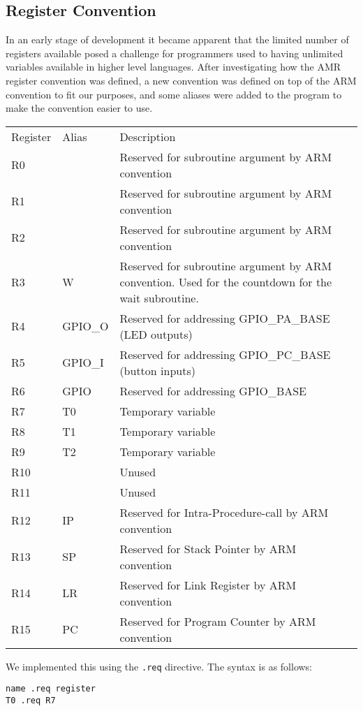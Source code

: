 \subsection{Register Convention}

In an early stage of development it became apparent that the limited number of registers available posed a challenge for programmers used to having unlimited variables available in higher level languages.
After investigating how the AMR register convention was defined, a new convention was defined on top of the ARM convention to fit our purposes, and some aliases were added to the program to make the convention easier to use.

\begin{table}
    \begin{tabular}{lll}
        Register & Alias   & Description                                            \\
        R0       & ~       & Reserved for subroutine argument by ARM convention     \\
        R1       & ~       & Reserved for subroutine argument by ARM convention     \\
        R2       & ~       & Reserved for subroutine argument by ARM convention     \\
        R3       & W       & Reserved for subroutine argument by ARM convention.
                             Used for the countdown for the wait subroutine.        \\
        R4       & GPIO\_O & Reserved for addressing GPIO\_PA\_BASE (LED outputs)   \\
        R5       & GPIO\_I & Reserved for addressing GPIO\_PC\_BASE (button inputs) \\
        R6       & GPIO    & Reserved for addressing GPIO\_BASE                     \\
        R7       & T0      & Temporary variable                                     \\
        R8       & T1      & Temporary variable                                     \\
        R9       & T2      & Temporary variable                                     \\
        R10      & ~       & Unused                                                 \\
        R11      & ~       & Unused                                                 \\
        R12      & IP      & Reserved for Intra-Procedure-call by ARM convention    \\
        R13      & SP      & Reserved for Stack Pointer by ARM convention           \\
        R14      & LR      & Reserved for Link Register  by ARM convention          \\
        R15      & PC      & Reserved for Program Counter by ARM convention    \\
    \end{tabular}
\end{table}

We implemented this using the \texttt{.req} directive. The syntax is as follows:

\begin{lstlisting}[label=register-aliasing,caption=Register aliasing]
name .req register
T0 .req R7
\end{lstlisting}

